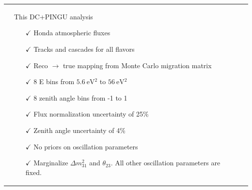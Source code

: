 \documentclass[draft=True]{revtex4-2}
\newcommand{\dm}{\Delta m^2_{31}}
\begin{document}
\begin{tabular}{p{55mm}p{55mm}p{55mm}}
\begin{itemize}
      \end{itemize} &
    This DC+PINGU analysis
      \begin{itemize}
         \item[$\checkmark$] Honda atmospheric fluxes
         \item[$\checkmark$] Tracks and cascades for all flavors
         \vspace{1em} 
         \item[$\checkmark$] Reco $\to$ true mapping from Monte Carlo migration matrix
         \item[$\checkmark$] 8 E bins from $\SI{5.6}{\electronvolt^2}$ to $\SI{56}{\electronvolt^2}$
         \item[$\checkmark$] 8 zenith angle bins from -1 to 1
         \item[$\checkmark$] Flux normalization uncertainty of 25\%
         \item[$\checkmark$] Zenith angle uncertainty of 4\% 
         \item[$\checkmark$] No priors on oscillation parameters 
         \item[$\checkmark$] Marginalize $\dm$ and $\theta_{23}$. All other oscillation parameters are fixed.
      \end{itemize} 
\end{tabular}
\end{document}
